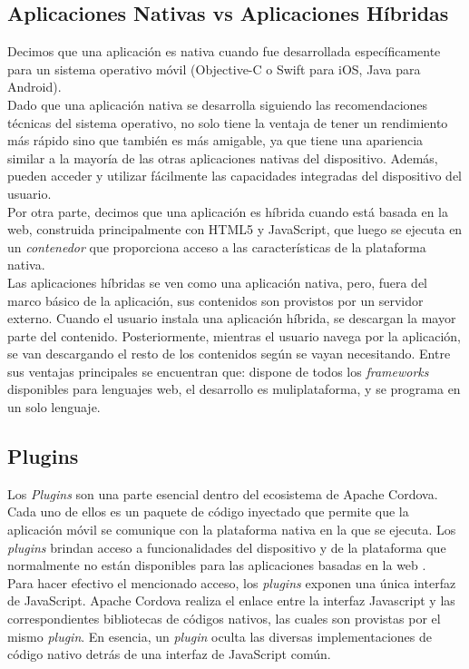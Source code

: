 \subsection{Aplicaciones Nativas vs Aplicaciones Híbridas}
Decimos que una aplicación es nativa cuando fue desarrollada específicamente para un sistema operativo móvil (Objective-C o Swift para iOS, Java para Android).\\

Dado que una aplicación nativa se desarrolla siguiendo las recomendaciones técnicas del sistema operativo, no solo tiene la ventaja de tener un rendimiento más rápido sino que también es más amigable, ya que tiene una apariencia similar a la mayoría de las otras aplicaciones nativas del dispositivo. Además, pueden acceder y utilizar fácilmente las capacidades integradas del dispositivo del usuario.\\

Por otra parte, decimos que una aplicación es híbrida cuando está basada en la web, construida principalmente con HTML5 y JavaScript, que luego se ejecuta en un \emph{contenedor} que proporciona acceso a las características de la plataforma nativa.\\

Las aplicaciones híbridas se ven como una aplicación nativa, pero, fuera del marco básico de la aplicación, sus contenidos son provistos por un servidor externo. Cuando el usuario instala una aplicación híbrida, se descargan la mayor parte del contenido. Posteriormente, mientras el usuario navega por la aplicación, se van descargando el resto de los contenidos según se vayan necesitando. Entre sus ventajas principales se encuentran que: dispone de todos los \emph{frameworks} disponibles para lenguajes web, el desarrollo es muliplataforma, y se programa en un solo lenguaje.
\subsection{Plugins}
Los \emph{Plugins} son una parte esencial dentro del ecosistema de Apache Cordova. Cada uno de ellos es un paquete de código inyectado que permite que la aplicación móvil se comunique con la plataforma nativa en la que se ejecuta. Los \emph{plugins} brindan acceso a funcionalidades del dispositivo y de la plataforma que normalmente no están disponibles para las aplicaciones basadas en la web \cite{ACP}.\\

Para hacer efectivo el mencionado acceso, los \emph{plugins} exponen una única interfaz de JavaScript. Apache Cordova realiza el enlace entre la interfaz Javascript y las correspondientes bibliotecas de códigos nativos, las cuales son provistas por el mismo \emph{plugin}. En esencia, un \emph{plugin} oculta las diversas implementaciones de código nativo detrás de una interfaz de JavaScript común.\\


